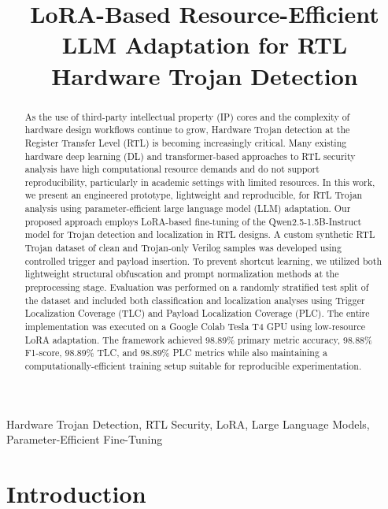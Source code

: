 \documentclass[conference]{IEEEtran}
\title{LoRA-Based Resource-Efficient LLM Adaptation for RTL Hardware Trojan Detection}
\begin{document}
\maketitle


\begin{abstract}
As the use of third-party intellectual property (IP) cores and the complexity of hardware design workflows continue to grow, Hardware Trojan detection at the Register Transfer Level (RTL) is becoming increasingly critical. Many existing hardware deep learning (DL) and transformer-based approaches to RTL security analysis have high computational resource demands and do not support reproducibility, particularly in academic settings with limited resources. In this work, we present an engineered prototype, lightweight and reproducible, for RTL Trojan analysis using parameter-efficient large language model (LLM) adaptation. Our proposed approach employs LoRA-based fine-tuning of the Qwen2.5-1.5B-Instruct model for Trojan detection and localization in RTL designs. A custom synthetic RTL Trojan dataset of clean and Trojan-only Verilog samples was developed using controlled trigger and payload insertion. To prevent shortcut learning, we utilized both lightweight structural obfuscation and prompt normalization methods at the preprocessing stage. Evaluation was performed on a randomly stratified test split of the dataset and included both classification and localization analyses using Trigger Localization Coverage (TLC) and Payload Localization Coverage (PLC). The entire implementation was executed on a Google Colab Tesla T4 GPU using low-resource LoRA adaptation. The framework achieved 98.89\% primary metric accuracy, 98.88\% F1-score, 98.89\% TLC, and 98.89\% PLC metrics while also maintaining a computationally-efficient training setup suitable for reproducible experimentation.
\end{abstract}

\begin{IEEEkeywords}
Hardware Trojan Detection,
RTL Security,
LoRA,
Large Language Models,
Parameter-Efficient Fine-Tuning
\end{IEEEkeywords}

\section{Introduction}
\label{sec:introduction}
\end{document}
